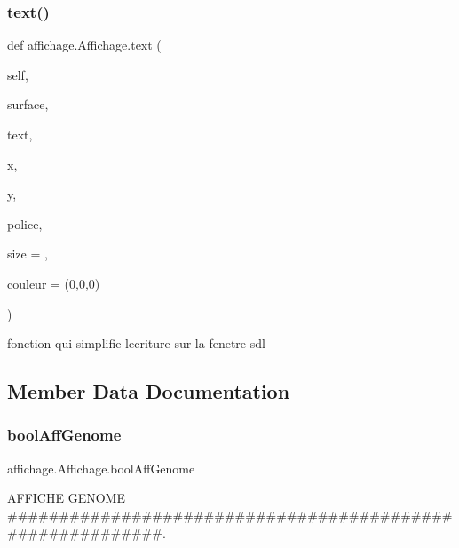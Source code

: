 \subsubsection{\texorpdfstring{text()}{text()}}
{\footnotesize\ttfamily def affichage.\+Affichage.\+text (\begin{DoxyParamCaption}\item[{}]{self,  }\item[{}]{surface,  }\item[{}]{text,  }\item[{}]{x,  }\item[{}]{y,  }\item[{}]{police,  }\item[{}]{size = {},  }\item[{}]{couleur = {\ttfamily (0,0,0)} }\end{DoxyParamCaption})}



fonction qui simplifie l\textquotesingle{}ecriture sur la fenetre sdl 



\subsection{Member Data Documentation}
\mbox{\label{classaffichage_1_1_affichage_a5ae8cd3838187cd4b0ebab27b1da1e16}} 
\subsubsection{\texorpdfstring{bool\+Aff\+Genome}{boolAffGenome}}
{\footnotesize\ttfamily affichage.\+Affichage.\+bool\+Aff\+Genome}



A\+F\+F\+I\+C\+HE G\+E\+N\+O\+ME \#\#\#\#\#\#\#\#\#\#\#\#\#\#\#\#\#\#\#\#\#\#\#\#\#\#\#\#\#\#\#\#\#\#\#\#\#\#\#\#\#\#\#\#\#\#\#\#\#\#\#\#\#\#\#\#\#\#. 

\mbox{\label{classaffichage_1_1_affichage_af65584cd9fab64ae77b2f27c59e4f346}} 
